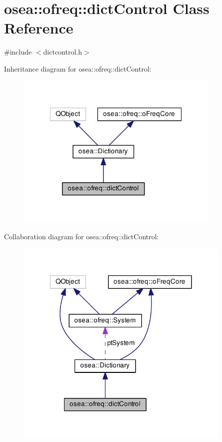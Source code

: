 \hypertarget{classosea_1_1ofreq_1_1dict_control}{\section{osea\-:\-:ofreq\-:\-:dict\-Control Class Reference}
\label{classosea_1_1ofreq_1_1dict_control}
}


{\ttfamily \#include $<$dictcontrol.\-h$>$}



Inheritance diagram for osea\-:\-:ofreq\-:\-:dict\-Control\-:\nopagebreak
\begin{figure}[H]
\begin{center}
\leavevmode
\includegraphics[width=275pt]{classosea_1_1ofreq_1_1dict_control__inherit__graph}
\end{center}
\end{figure}


Collaboration diagram for osea\-:\-:ofreq\-:\-:dict\-Control\-:\nopagebreak
\begin{figure}[H]
\begin{center}
\leavevmode
\includegraphics[width=291pt]{classosea_1_1ofreq_1_1dict_control__coll__graph}
\end{center}
\end{figure}
